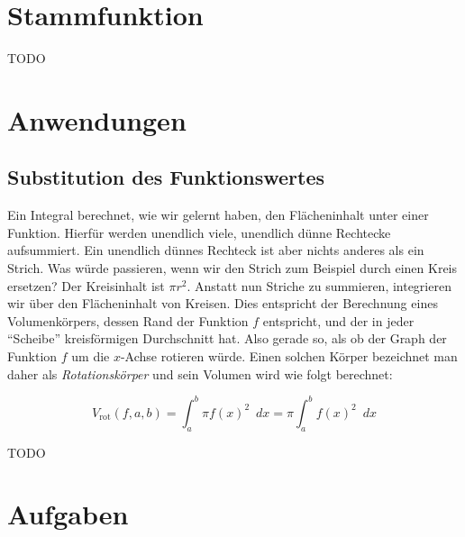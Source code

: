 \section{Stammfunktion}

TODO

\section{Anwendungen}

\subsection{Substitution des Funktionswertes}

Ein Integral berechnet, wie wir gelernt haben, den Flächeninhalt unter einer Funktion. Hierfür werden unendlich viele, unendlich dünne Rechtecke aufsummiert. Ein unendlich dünnes Rechteck ist aber nichts anderes als ein Strich. Was würde passieren, wenn wir den Strich zum Beispiel durch einen Kreis ersetzen? Der Kreisinhalt ist $\pi r^2$. Anstatt nun Striche zu summieren, integrieren wir über den Flächeninhalt von Kreisen. Dies entspricht der Berechnung eines Volumenkörpers, dessen Rand der Funktion $f$ entspricht, und der in jeder "`Scheibe"' kreisförmigen Durchschnitt hat. Also gerade so, als ob der Graph der Funktion $f$ um die $x$-Achse rotieren würde. Einen solchen Körper bezeichnet man daher als \emph{Rotationskörper} und sein Volumen wird wie folgt berechnet:

\begin{equation}
V_{\text{rot}}(f,a,b) = \int_a^b \pi f(x)^2 \enspace dx=  \pi \int_a^b f(x)^2 \enspace dx
\end{equation}

TODO

\section{Aufgaben}